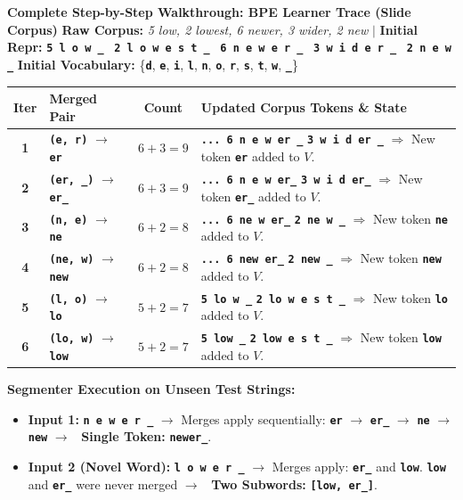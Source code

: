 \documentclass[10pt,a4paper]{article}
\newcommand{\rx}[1]{\texttt{\bfseries\color{inlinecode}#1}}
\newcommand{\cmark}{\textcolor{accentgreen}{\textbf{\checkmark}}}
\begin{document}
\vspace{-2pt}
\begin{examplebox}
\footnotesize
\textbf{Complete Step-by-Step Walkthrough: BPE Learner Trace (Slide Corpus)}
\newline \textbf{Raw Corpus:} \textit{5 low, 2 lowest, 6 newer, 3 wider, 2 new} $\vert$ \textbf{Initial Repr:} \rx{5 l o w \_} \ \rx{2 l o w e s t \_} \ \rx{6 n e w e r \_} \ \rx{3 w i d e r \_} \ \rx{2 n e w \_}
\newline \textbf{Initial Vocabulary:} \{\rx{d}, \rx{e}, \rx{i}, \rx{l}, \rx{n}, \rx{o}, \rx{r}, \rx{s}, \rx{t}, \rx{w}, \rx{\_}\}

\vspace{1pt}
\noindent\begin{tabularx}{\textwidth}{c l c >{\raggedright\arraybackslash}X}
\toprule
\rowcolor{lightbg}
\textbf{Iter} & \textbf{Merged Pair} & \textbf{Count} & \textbf{Updated Corpus Tokens \& State} \\
\midrule
\textbf{1} & \rx{(e, r)} $\rightarrow$ \rx{er} & $6 + 3 = 9$ & \rx{... 6 n e w er \_} \quad \rx{3 w i d er \_} $\Longrightarrow$ New token \rx{er} added to $V$. \\
\textbf{2} & \rx{(er, \_)} $\rightarrow$ \rx{er\_} & $6 + 3 = 9$ & \rx{... 6 n e w er\_} \quad \rx{3 w i d er\_} $\Longrightarrow$ New token \rx{er\_} added to $V$. \\
\textbf{3} & \rx{(n, e)} $\rightarrow$ \rx{ne} & $6 + 2 = 8$ & \rx{... 6 ne w er\_} \quad \rx{2 ne w \_} $\Longrightarrow$ New token \rx{ne} added to $V$. \\
\textbf{4} & \rx{(ne, w)} $\rightarrow$ \rx{new} & $6 + 2 = 8$ & \rx{... 6 new er\_} \quad \rx{2 new \_} $\Longrightarrow$ New token \rx{new} added to $V$. \\
\textbf{5} & \rx{(l, o)} $\rightarrow$ \rx{lo} & $5 + 2 = 7$ & \rx{5 lo w \_} \quad \rx{2 lo w e s t \_} $\Longrightarrow$ New token \rx{lo} added to $V$. \\
\textbf{6} & \rx{(lo, w)} $\rightarrow$ \rx{low} & $5 + 2 = 7$ & \rx{5 low \_} \quad \rx{2 low e s t \_} $\Longrightarrow$ New token \rx{low} added to $V$. \\
\bottomrule
\end{tabularx}

\vspace{1pt}
\textbf{Segmenter Execution on Unseen Test Strings:}
\begin{itemize}[leftmargin=12pt, itemsep=0.5pt, parsep=0pt, topsep=0.5pt]
    \item \textbf{Input 1:} \rx{n e w e r \_} $\longrightarrow$ Merges apply sequentially: \rx{er} $\rightarrow$ \rx{er\_} $\rightarrow$ \rx{ne} $\rightarrow$ \rx{new} $\rightarrow$ \cmark\ \textbf{Single Token:} \rx{newer\_}.
    \item \textbf{Input 2 (Novel Word):} \rx{l o w e r \_} $\longrightarrow$ Merges apply: \rx{er\_} and \rx{low}. \rx{low} and \rx{er\_} were never merged $\rightarrow$ \cmark\ \textbf{Two Subwords:} \rx{[low, er\_]}.
\end{itemize}
\end{examplebox}
\end{document}
